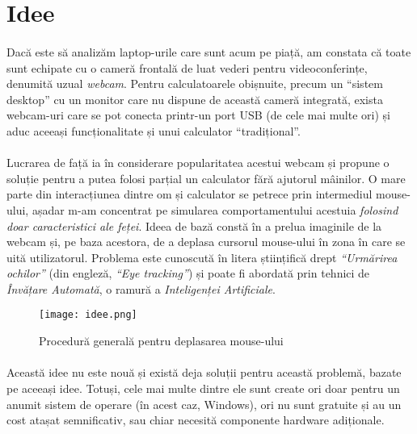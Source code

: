 \section*{Idee}
\paragraph{}
Dacă este să analizăm laptop-urile care sunt acum pe piață, am constata că toate sunt echipate cu o cameră frontală de luat vederi pentru videoconferințe, denumită uzual \emph{webcam}.
Pentru calculatoarele obișnuite, precum un ``sistem desktop'' cu un monitor care nu dispune de această cameră integrată, exista webcam-uri care se pot conecta printr-un port USB (de cele mai multe ori) și aduc aceeași funcționalitate și unui calculator ``tradițional''.

\paragraph{}
Lucrarea de față ia în considerare popularitatea acestui webcam și propune o soluție pentru a putea folosi parțial un calculator fără ajutorul mâinilor.
O mare parte din interacțiunea dintre om și calculator se petrece prin intermediul mouse-ului, așadar m-am concentrat pe simularea comportamentului acestuia \emph{folosind doar caracteristici ale feței}.
Ideea de bază constă în a prelua imaginile de la webcam și, pe baza acestora, de a deplasa cursorul mouse-ului în zona în care se uită utilizatorul.
Problema este cunoscută în litera științifică drept \emph{``Urmărirea ochilor''} (din engleză, \emph{``Eye tracking''}) și poate fi abordată prin tehnici de \emph{Învățare Automată}, o ramură a \emph{Inteligenței Artificiale}.

\begin{figure}[h]
    \centering
    \texttt{[image: idee.png]}
    \caption{Procedură generală pentru deplasarea mouse-ului}
\end{figure}

\paragraph{}
Această idee nu este nouă și există deja soluții pentru această problemă, bazate pe aceeași idee.
Totuși, cele mai multe dintre ele sunt create ori doar pentru un anumit sistem de operare (în acest caz, Windows), ori nu sunt gratuite și au un cost atașat semnificativ, sau chiar necesită componente hardware adiționale.

